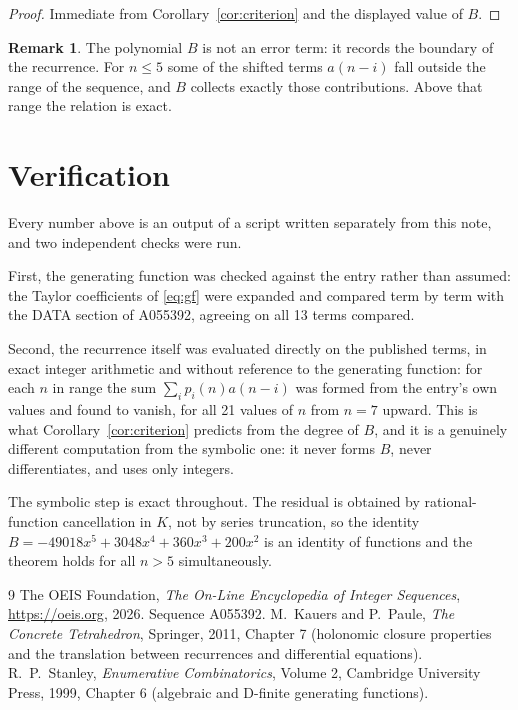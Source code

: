 \documentclass[11pt,a4paper]{article}
\theoremstyle{plain}
\theoremstyle{definition}
\newtheorem{remark}[theorem]{Remark}
\begin{document}
\begin{proof}
Immediate from Corollary~\ref{cor:criterion} and the displayed value of $B$.
\end{proof}

\begin{remark}
The polynomial $B$ is not an error term: it records the boundary of the recurrence. For
$n\le5$ some of the shifted terms $a(n-i)$ fall outside the range of the sequence,
and $B$ collects exactly those contributions. Above that range the relation is exact.
\end{remark}

\section{Verification}

Every number above is an output of a script written separately from this note, and two
independent checks were run.

First, the generating function was checked against the entry rather than assumed: the
Taylor coefficients of \eqref{eq:gf} were expanded and compared term by term with the DATA
section of A055392, agreeing on all 13 terms compared.

Second, the recurrence itself was evaluated directly on the published terms, in exact
integer arithmetic and without reference to the generating function: for each $n$ in range
the sum $\sum_{i}p_{i}(n)a(n-i)$ was formed from the entry's own values and found to
vanish, for all 21 values of $n$ from $n=7$ upward. This is what
Corollary~\ref{cor:criterion} predicts from the degree of $B$, and it is a genuinely
different computation from the symbolic one: it never forms $B$, never differentiates, and
uses only integers.

The symbolic step is exact throughout. The residual is obtained by rational-function
cancellation in $K$, not by series truncation, so the identity $B=- 49018 x^{5} + 3048 x^{4} + 360 x^{3} + 200 x^{2}$ is an
identity of functions and the theorem holds for all $n>5$ simultaneously.

\begin{thebibliography}{9}
 The OEIS Foundation, \emph{The On-Line Encyclopedia of Integer Sequences},
\url{https://oeis.org}, 2026. Sequence A055392.
 M.~Kauers and P.~Paule, \emph{The Concrete Tetrahedron}, Springer, 2011,
Chapter 7 (holonomic closure properties and the translation between recurrences and
differential equations).
 R.~P.~Stanley, \emph{Enumerative Combinatorics}, Volume 2, Cambridge
University Press, 1999, Chapter 6 (algebraic and D-finite generating functions).
\end{thebibliography}
\end{document}
